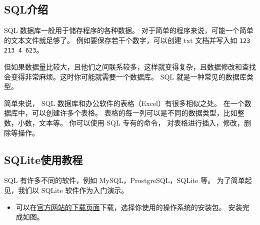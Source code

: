 

\subsection{SQL介绍}
SQL 数据库一般用于储存程序的各种数据。 对于简单的程序来说，可能一个简单的文本文件就足够了。 例如要保存若干个数字，可以创建 txt 文档并写入如 \verb|123 213 4 623|。

但如果数据量比较大，且他们之间联系较多，这样就变得复杂，且数据修改和查找会变得非常麻烦。这时你可能就需要一个数据库。 SQL 就是一种常见的数据库类型。

简单来说， SQL 数据库和办公软件的表格（Excel）有很多相似之处。 在一个数据库中，可以创建许多个表格。 表格的每一列可以是不同的数据类型，比如整数，小数，文本等。 你可以使用 SQL 专有的命令， 对表格进行插入，修改，删除等操作。

\subsection{SQLite使用教程}


SQL 有许多不同的软件，例如 MySQL，ProstgreSQL，SQLite 等。 为了简单起见，我们以 SQLite 软件作为入门演示。
\begin{itemize}
\item 可以在\href{https://sqlitebrowser.org/dl/}{官方网站的下载页面}下载，选择你使用的操作系统的安装包。 安装完成如图。
\end{itemize}










